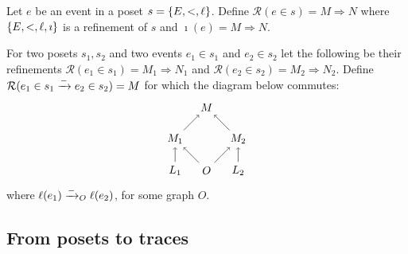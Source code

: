 \begin{definition}
  Let $e$ be an event in a poset $s=\{E,<,\ell\}$.
  Define $\mathcal{R}(e\in s) = M\Rightarrow N$ where $\{E,<,\ell,\imath\}$ is a refinement of $s$ and $\imath(e) = M\Rightarrow N$.
\end{definition}

\begin{definition}
\label{def:ref_neg_infl}
  For two posets $s_1,s_2$ and two events $e_1\in s_1$ and $e_2\in s_2$ let the following be their refinements $\mathcal{R}(e_1\in s_1) = M_1\Rightarrow N_1$ and $\mathcal{R}(e_2\in s_2) = M_2\Rightarrow N_2$. Define $\mathcal{R}(e_1\in s_1\mathrel{\xrightarrow{-}} e_2\in s_2) = M$ for which the diagram below commutes:
  \[
  \begin{tikzpicture} %
    \node (o) at (0,0) {\(O\)};
    \node (n) at (0,2) {\(M\)};
    \node (l1) at (-1,0) {\(L_1\)};
    \node (l2) at (1,0) {\(L_2\)};
    \node (n1) at (-1,1) {\(M_1\)};
    \node (n2) at (1,1) {\(M_2\)};
    \draw [->] (l1) -- (n1);
    \draw [->] (l2) -- (n2);
    \draw [->] (o) -- (n1);
    \draw [->] (o) -- (n2);
    \draw [->] (n1) -- (n);
    \draw [->] (n2) -- (n);
  \end{tikzpicture}
  \]
  where $\ell(e_1)\mathrel{\xrightarrow{-}}_O\ell(e_2)$, for some graph $O$.
\end{definition}

\subsection{From posets to traces}


